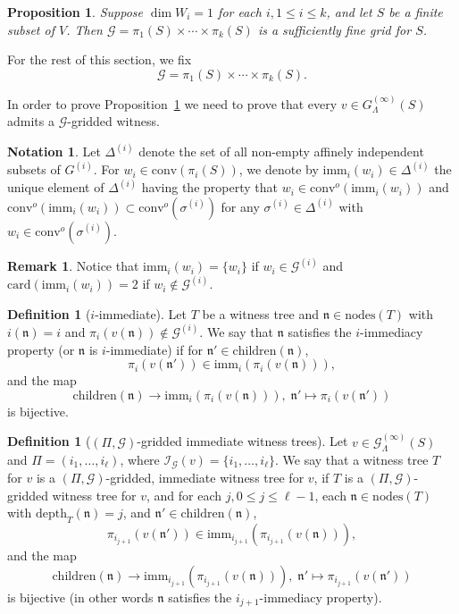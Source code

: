 \documentclass[10pt]{amsart}
\theoremstyle{plain}
\newtheorem{proposition}[lemma]{Proposition}
\theoremstyle{definition}
\newtheorem{definition}[lemma]{Definition}
\newtheorem{notation}[lemma]{Notation}
\newtheorem{remark}[lemma]{Remark}
\providecommand{\cG}[0]{\ensuremath{\mathcal G}\xspace}
\providecommand{\cI}[0]{\ensuremath{\mathcal I}\xspace}
\let\leq\leqslant
\providecommand{\imm}[0]{\ensuremath{\mathrm{imm}}\xspace}
\providecommand{\conv}[1]{\ensuremath{\mathrm{conv}{\left({#1}\right)}\xspace}}
\providecommand{\convo}[1]{\ensuremath{\mathrm{conv}^o{\left({#1}\right)}\xspace}}
\providecommand{\card}[0]{\ensuremath{\mathrm{card}}\xspace}
\begin{document}
\begin{proposition}
    \label{prop:existence-of-grid}
    Suppose $\dim W_i = 1$ for each $i, 1\leq i\leq k$, and let $S$ be a finite subset
    of $V$. Then $\cG = \pi_1(S) \times \cdots \times \pi_k(S)$ is a sufficiently
    fine grid for $S$.
\end{proposition}

For the rest of this section, we fix 
\[
\cG = \pi_1(S) \times \cdots \times \pi_k(S).
\]

In order to prove Proposition~\ref{prop:existence-of-grid} we need to prove that every $v \in G^{(\infty)}_\Lambda(S)$ admits a $\cG$-gridded witness.

\begin{notation}
\label{not:immediate}
Let \(\Delta^{(i)}\) denote the set of all non-empty affinely independent
subsets of \(G^{(i)}\).
    For $w_i \in \conv{\pi_i(S)}$, we denote by $\imm_i(w_i) \in \Delta^{(i)}$ the unique element of $\Delta^{(i)}$ having the property that $w_i \in \convo{\imm_i(w_i)}$ and 
    $\convo{\imm_i(w_i)} \subset \convo{\sigma^{(i)}}$ for any
    $\sigma^{(i)} \in \Delta^{(i)}$ with $w_i \in \convo{\sigma^{(i)}}$.
    \end{notation}
\begin{remark}
\label{rem:immediate}
   Notice that $\imm_i(w_i) = \{w_i\}$ if $w_i \in \cG^{(i)}$ and 
    $\card(\imm_i(w_i)) = 2$ if $w_i \not\in \cG^{(i)}$. 
\end{remark}

\begin{definition}[$i$-immediate]
    Let $T$ be a witness tree and $\mathfrak{n} \in \mathrm{nodes}(T)$ with
    $i(\mathfrak{n}) = i$ and $\pi_i(v(\mathfrak{n})) \not\in \cG^{(i)}$. 
    We say that $\mathfrak{n}$ satisfies the $i$-immediacy property (or $\mathfrak{n}$ is $i$-immediate) if
    for $\mathfrak{n}' \in \mathrm{children}(\mathfrak{n})$, 
 \[
 \pi_{i}(v(\mathfrak{n}')) \in \imm_{i} (\pi_i(v(\mathfrak{n}))),
 \]
and the map
\[
\mathrm{children}(\mathfrak{n}) \rightarrow \imm_{i}(\pi_i(v(\mathfrak{n}))),\;
\mathfrak{n}' \mapsto \pi_{i}(v(\mathfrak{n}'))
\]
is bijective.
\end{definition}


\begin{definition}[$(\Pi,\cG)$-gridded immediate witness trees]
Let $v \in \cG^{(\infty)}_\Lambda(S)$ and $\Pi=(i_1,\ldots,i_\ell)$, where $\cI_\cG(v) = \{i_1,\ldots,i_\ell\}$.
 We say that a witness tree $T$ for $v$ is a $(\Pi,\cG)$-gridded,  
 immediate witness tree for $v$,
 if $T$ is a $(\Pi,\cG)$-gridded witness tree for $v$, and
 for each $j, 0 \leq j \leq \ell-1$,
 each $\mathfrak{n} \in \mathrm{nodes}(T)$ with $\mathrm{depth}_T(\mathfrak{n}) = j$, and 
  $\mathfrak{n}' \in \mathrm{children}(\mathfrak{n})$, 
 \[
 \pi_{i_{j+1}}(v(\mathfrak{n}')) \in \imm_{i_{j+1}} (\pi_{i_{j+1}}(v(\mathfrak{n}))),
 \]
and the map
\[
\mathrm{children}(\mathfrak{n}) \rightarrow \imm_{i_{j+1}}(\pi_{i_{j+1}}(v(\mathfrak{n}))),\;
\mathfrak{n}' \mapsto \pi_{i_{j+1}}(v(\mathfrak{n}'))
\]
is bijective
(in other words $\mathfrak{n}$ satisfies the $i_{j+1}$-immediacy property). 
\end{definition}
\end{document}
